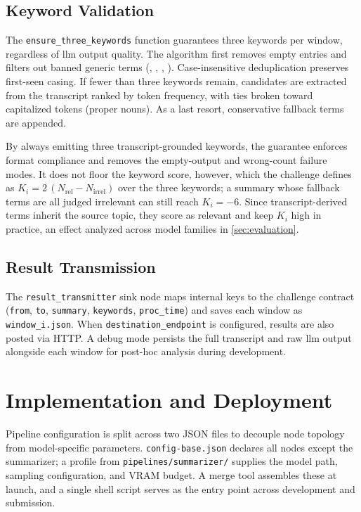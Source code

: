 \documentclass[conference,letterpaper]{IEEEtran}
\begin{document}
\subsection{Keyword Validation}
\label{sec:arch:keywords}

The \texttt{ensure\_three\_keywords} function guarantees three keywords per window, regardless of \gls{llm} output quality.
The algorithm first removes empty entries and filters out banned generic terms (, , , \etc).
Case-insensitive deduplication preserves first-seen casing.
If fewer than three keywords remain, candidates are extracted from the transcript ranked by token frequency, with ties broken toward capitalized tokens (\eg proper nouns).
As a last resort, conservative fallback terms are appended.

By always emitting three transcript-grounded keywords, the guarantee enforces format compliance and removes the empty-output and wrong-count failure modes.
It does not floor the keyword score, however, which the challenge defines as $K_i = 2\,(N_\text{rel} - N_\text{irrel})$ over the three keywords; a summary whose fallback terms are all judged irrelevant can still reach $K_i = -6$.
Since transcript-derived terms inherit the source topic, they score as relevant and keep $K_i$ high in practice, an effect analyzed across model families in \cref{sec:evaluation}.

\subsection{Result Transmission}
\label{sec:arch:sink}

The \texttt{result\_transmitter} sink node maps internal keys to the challenge contract (\texttt{from}, \texttt{to}, \texttt{summary}, \texttt{keywords}, \texttt{proc\_time}) and saves each window as \texttt{window\_i.json}.
When \texttt{destination\_endpoint} is configured, results are also posted via HTTP.
A debug mode persists the full transcript and raw \gls{llm} output alongside each window for post-hoc analysis during development.

\section{Implementation and Deployment}
\label{sec:implementation}

Pipeline configuration is split across two JSON files to decouple node topology from model-specific parameters.
\texttt{config-base.json} declares all nodes except the summarizer; a profile from \texttt{pipelines/summarizer/} supplies the model path, sampling configuration, and VRAM budget.
A merge tool assembles these at launch, and a single shell script serves as the entry point across development and submission.
\end{document}
